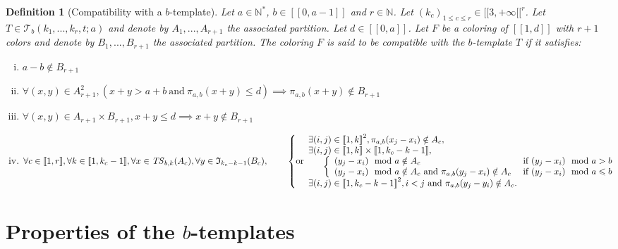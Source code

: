 \documentclass{article}
\newtheorem{definition}{Definition}[section]
\newcommand{\TS}{\mathit{TS}}
\begin{document}
\begin{definition}[Compatibility with a \(b\)-template]
Let \(a \in \mathbb{N}^*\), \(b \in [\![0, a - 1]\!]\) and \(r \in \mathbb{N}\). Let 
\((k_c)_{1 \leqslant c \leqslant r} \in {[\![3, + \infty [\![}^r\). Let \(T \in \mathcal{T}_b(k_1, ..., k_r, t; a)\) 
and denote by \(A_1, ..., A_{r+1}\) the associated partition. Let \(d \in [\![0, a]\!]\). Let \(F\) be a coloring of 
\([\![1, d]\!]\) with \(r +1\) colors and denote by \(B_1, ..., B_{r + 1}\) the associated partition. The coloring 
\(F\) is said to be compatible with the \(b\)-template \(T\) if it satisfies:
\begin{enumerate}[(i)]
\item \(a - b \notin B_{r + 1}\)
\item \(\forall (x,y) \in A_{r+1}^2, (x + y > a + b ~\text{and}~ \pi_{a, b}(x + y) \leqslant d) \implies \pi_{a, b}
	(x + y)  \notin B_{r+1}\)
\item \(\forall (x,y) \in A_{r+1} \times B_{r+1}, x + y \leqslant d \implies x + y  \notin B_{r+1}\)
\item \(\forall c \in [\![1, r]\!], \forall k \in [\![1, k_c-1]\!], \forall x \in \TS_{b, k}(A_c), \forall y \in 
	\mathfrak{I}_{k_c - k - 1}(B_c), \\
	\begin{array}{l}
		\mspace{30mu} 
		\left\{ \text{or} 
		\begin{array}{l}
			\exists (i, j) \in {[\![1, k]\!]}^2, \pi_{a, b}(x_j - x_i) \notin A_c, \\
			\exists (i, j) \in [\![1, k]\!] \times [\![1, k_c - k - 1]\!], \\
			\mspace{30mu}
				\left \{
				\begin{array}{l l}
					(y_j - x_i) \mod a \notin A_c & ~\text{if}~ (y_j - x_i) \mod a > b \\
					(y_j - x_i) \mod a \notin A_c ~\text{and}~ \pi_{a, b}(y_j - x_i) \notin A_c & ~\text{if}~ (y_j - x_i) \mod a 
						\leqslant b \\
				\end{array}
				\right. \\
			\exists (i, j) \in {[\![1, k_c - k - 1]\!]}^2, i < j ~\text{and}~ \pi_{a, b}(y_j - y_i) \notin A_c.
		\end{array}
		\right.
	\end{array}\)
\end{enumerate}
\end{definition}

\section{Properties of the \(b\)-templates}
\label{sec:results}
\end{document}

